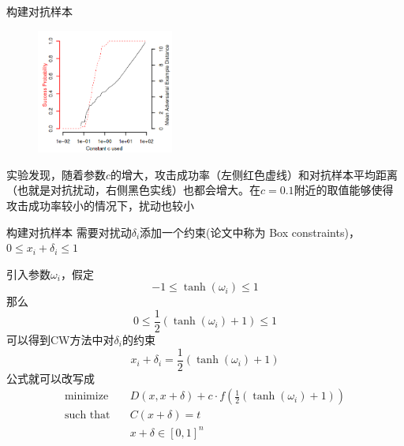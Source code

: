 \begin{frame}{构建对抗样本}
    \begin{multicols}{2}
        \begin{figure}
            \centering
            \includegraphics[width=0.4\textwidth]{docs/paperReading/CW_attack/const-c.png}
        \end{figure}
        实验发现，随着参数$c$的增大，攻击成功率（左侧红色虚线）和对抗样本平均距离（也就是对抗扰动，右侧黑色实线）也都会增大。在$c=0.1$附近的取值能够使得攻击成功率较小的情况下，扰动也较小
    \end{multicols}
\end{frame}


\begin{frame}{构建对抗样本}    
    需要对扰动$\delta_i$添加一个约束(论文中称为 Box constraints)，$0\leq x_i+\delta_i\leq 1$

    引入参数$\omega_i$，假定
    \begin{equation}
        -1\leq \tanh(\omega_i)\leq 1
    \end{equation}
    那么
    \begin{equation}
        0\leq \frac{1}{2}(\tanh(\omega_i)+1)\leq 1
    \end{equation}
    可以得到CW方法中对$\delta_i$的约束
    \begin{equation}
        x_i+\delta_i=\frac{1}{2}(\tanh(\omega_i)+1)
    \end{equation}
    公式就可以改写成
    \begin{equation}
        \begin{aligned}
            \text{minimize}\quad    & D(x,x+\delta)+c\cdot f(\frac{1}{2}(\tanh(\omega_i)+1)) \\
            \text{such that}\quad   & C(x+\delta)=t \\
                                    & x+\delta \in [0,1]^n
        \end{aligned}
    \end{equation}

\end{frame}


